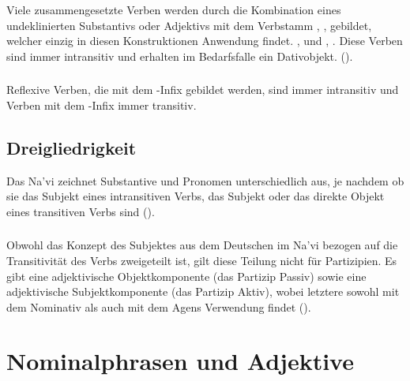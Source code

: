 \subsubsection{} Viele zusammengesetzte Verben werden durch die Kombination eines
undeklinierten Substantivs oder Adjektivs mit dem Verbstamm , ,
gebildet, welcher einzig in diesen Konstruktionen Anwendung findet. ,
 und , .
Diese Verben sind immer intransitiv und erhalten im Bedarfsfalle ein Dativobjekt.
().

\subsubsection{} Reflexive Verben, die mit dem -Infix gebildet werden,
sind immer intransitiv und Verben mit dem -Infix immer transitiv.

\subsection{Dreigliedrigkeit} Das Na’vi zeichnet Substantive und Pronomen unterschiedlich
aus, je nachdem ob sie das Subjekt eines intransitiven Verbs, das Subjekt oder das direkte
Objekt eines transitiven Verbs sind ().

\subsubsection{} Obwohl das Konzept des Subjektes aus dem Deutschen im Na’vi bezogen auf
die Transitivit\"at des Verbs zweigeteilt ist, gilt diese Teilung nicht f\"ur Partizipien.
Es gibt eine adjektivische Objektkomponente (das Partizip Passiv) sowie eine adjektivische
Subjektkomponente (das Partizip Aktiv), wobei letztere sowohl mit dem Nominativ als auch
mit dem Agens Verwendung findet ().

\subsubsection{} 


\section{Nominalphrasen und Adjektive}

